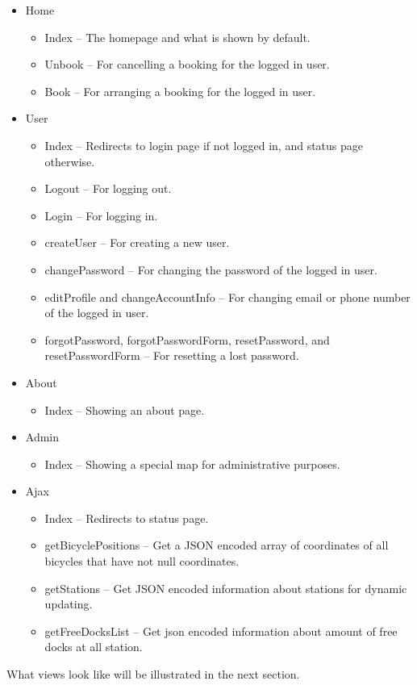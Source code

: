 \begin{itemize}
\item Home {\begin{itemize} 
            \item Index -- The homepage and what is shown by default.
            \item Unbook -- For cancelling a booking for the logged in user.
            \item Book -- For arranging a booking for the logged in user.
            \end{itemize}}
\item User {\begin{itemize} 
            \item Index -- Redirects to login page if not logged in, and status page otherwise.
            \item Logout -- For logging out.
            \item Login -- For logging in.
            \item createUser -- For creating a new user.
            \item changePassword -- For changing the password of the logged in user.
            \item editProfile and changeAccountInfo -- For changing email or phone number of the logged in user.
            \item forgotPassword, forgotPasswordForm, resetPassword, and resetPasswordForm -- For resetting a lost password.
            \end{itemize}}
\item About {\begin{itemize} 
            \item Index -- Showing an about page.
            \end{itemize}}
\item Admin {\begin{itemize} 
            \item Index -- Showing a special map for administrative purposes.
            \end{itemize}}
\item Ajax {\begin{itemize} 
            \item Index -- Redirects to status page.
            \item getBicyclePositions -- Get a JSON encoded array of coordinates of all bicycles that have not null coordinates.
            \item getStations -- Get JSON encoded information about stations for dynamic updating.
            \item getFreeDocksList -- Get json encoded information about amount of free docks at all station.
            \end{itemize}}
\end{itemize}

What views look like will be illustrated in the next section.